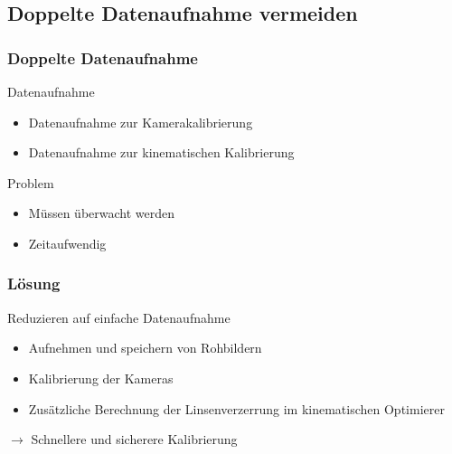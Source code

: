 \subsection{Doppelte Datenaufnahme vermeiden}

\begin{frame}
  \frametitle{Doppelte Datenaufnahme}
  \begin{block}{Datenaufnahme} \pause
    \begin{itemize}
      \item Datenaufnahme zur Kamerakalibrierung \pause
      \item Datenaufnahme zur kinematischen Kalibrierung \pause
    \end{itemize}
  \end{block}
  \begin{block}{Problem}
    \pause
    \begin{itemize}
      \item Müssen überwacht werden \pause
      \item Zeitaufwendig
    \end{itemize}
  \end{block}
\end{frame}

\begin{frame}
  \frametitle{Lösung}
  \begin{block} {Reduzieren auf einfache Datenaufnahme}
    \pause
    \begin{itemize}
      \item Aufnehmen und speichern von Rohbildern \pause
      \item Kalibrierung der Kameras \pause
      \item Zusätzliche Berechnung der Linsenverzerrung im kinematischen Optimierer \pause
    \end{itemize}
  \end{block}
$\rightarrow$ Schnellere und sicherere Kalibrierung
\end{frame}
